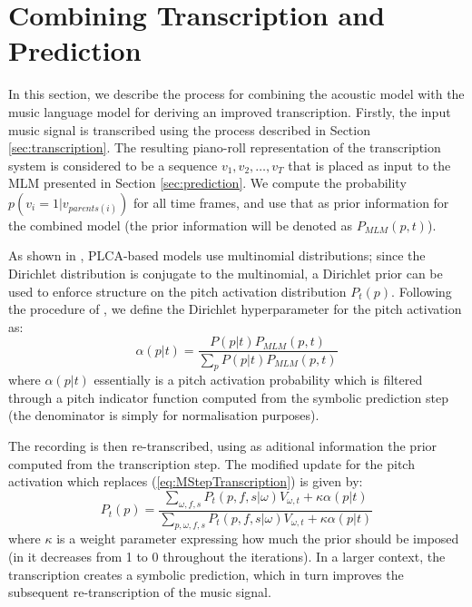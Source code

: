 \section{Combining Transcription and Prediction}
\label{sec:combination}


In this section, we describe the process for combining the acoustic model with the music language model for deriving an improved transcription. Firstly, the input music signal is transcribed using the process described in Section \ref{sec:transcription}. The resulting piano-roll representation of the transcription system is considered to be a sequence $v_1, v_2, \ldots, v_T$ that is placed as input to the MLM presented in Section \ref{sec:prediction}. We compute the probability $p(v_i=1|v_{parents(i)})$ for all time frames, and use that as prior information for the combined model (the prior information will be denoted as $P_{\mathit{MLM}}(p,t)$).

As shown in \cite{Smaragdis2009}, PLCA-based models use multinomial distributions; since the Dirichlet distribution is conjugate to the multinomial, a Dirichlet prior can be used to enforce structure on the pitch activation distribution $P_{t}(p)$. Following the procedure of \cite{Smaragdis2009}, we define the Dirichlet hyperparameter for the pitch activation as:
\begin{equation}
 \alpha(p|t) = \frac{P(p|t)P_{\mathit{MLM}}(p,t)}{\sum_{p}P(p|t)P_{\mathit{MLM}}(p,t)}
\end{equation}
where $\alpha(p|t)$ essentially is a pitch activation probability which is filtered through a pitch indicator function computed from the symbolic prediction step (the denominator is simply for normalisation purposes).

The recording is then re-transcribed, using as aditional information the prior computed from the transcription step. The modified update for the pitch activation which replaces (\ref{eq:MStepTranscription}) is given by:
\begin{equation}
 P_{t}(p) = \frac{\sum_{\omega,f,s}P_{t}(p,f,s|\omega)V_{\omega,t}+\kappa\alpha(p|t)}{\sum_{p,\omega,f,s}P_{t}(p,f,s|\omega)V_{\omega,t}+\kappa\alpha(p|t)} \label{eq:modifiedMStepPitchActivation}
\end{equation}
where $\kappa$ is a weight parameter expressing how much the prior should be imposed (in \cite{Smaragdis2009} it decreases from 1 to 0 throughout the iterations). In a larger context, the transcription creates a symbolic prediction, which in turn improves the subsequent re-transcription of the music signal.